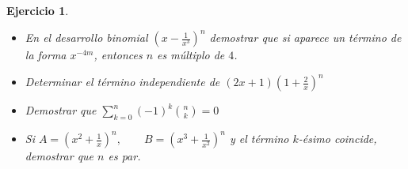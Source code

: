 \documentclass[12pt,twoside]{article}
\newtheorem{Ejer}{Ejercicio}
\begin{document}
\begin{Ejer}

\begin{itemize} Resolver los siguientes ejercicios:

\item[a) ] En el desarrollo binomial $\left(x-\frac{1}{x^3}\right)^n$ demostrar que si aparece un t\'ermino de la forma $x^{-4m}$, entonces $n$ es m\'ultiplo de $4$.

\item[b) ] Determinar el t\'ermino independiente de $(2x+1)\left(1+\frac{2}{x}\right)^n$

\item[c) ] Demostrar que $\sum_{k=0}^{n}(-1)^k\binom{n}{k}=0$

\item[d) ] Si $A=(x^2+\frac{1}{x})^n,\qquad B=(x^3+\frac{1}{x^2})^n$ y el t\'ermino $k$-\'esimo coincide, demostrar que $n$ es par.

\end{itemize}
\end{Ejer}
\end{document}
